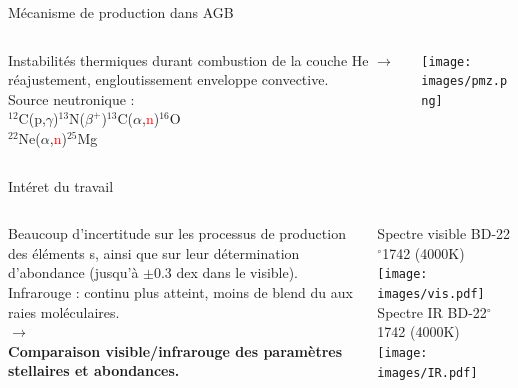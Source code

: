 \documentclass[10pt]{beamer}
\begin{document}
\begin{frame}[fragile]{Mécanisme de production dans AGB}
    \begin{columns}
        \begin{column}{0.3\textwidth}
            Instabilités thermiques durant combustion de la couche He $\rightarrow$ réajustement, engloutissement enveloppe convective. \\
            \vspace{2cm}
            Source neutronique : \\
            $^{12}$C(p,$\gamma$)$^{13}$N($\beta^+$)$^{13}$C($\alpha$,\textcolor{red}{n})$^{16}$O \\
             $^{22}$Ne($\alpha$,\textcolor{red}{n})$^{25}$Mg      
        \end{column}
        \begin{column}{0.7\textwidth}
            \begin{center}
                \texttt{[image: images/pmz.png]}
                \vspace{2cm}
            \end{center}
        \end{column}
    \end{columns}
\end{frame}

\begin{frame}[fragile]{Intéret du travail}
    \begin{columns}
        \begin{column}{0.45\textwidth}
            Beaucoup d'incertitude sur les processus de production des éléments s, ainsi que sur leur détermination d'abondance (jusqu'à $\pm$0.3 dex dans le visible). \\
            \vspace{0.5cm}
            Infrarouge : continu plus atteint, moins de blend du aux raies moléculaires. \\
            \vspace{0.5cm}
            \textbf{$\rightarrow$} \\
            \textbf{Comparaison visible/infrarouge des paramètres stellaires et abondances.}
        \end{column}  
        \begin{column}{0.55\textwidth}
            \begin{center}
            \footnotesize{Spectre visible BD-22$^{\circ}$1742 (4000K)}\\
            \texttt{[image: images/vis.pdf]}\\
            \footnotesize{Spectre IR BD-22$^{\circ}$1742 (4000K)}
            \texttt{[image: images/IR.pdf]}\\
            \end{center}
        \end{column}  
    \end{columns}
\end{frame}
\end{document}
